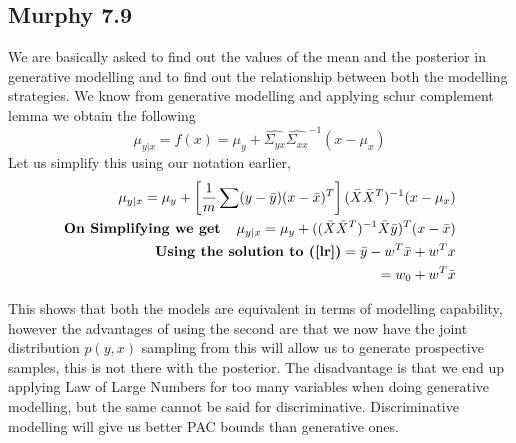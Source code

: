 \subsection{Murphy 7.9}
We are basically asked to find out the values of the mean and the posterior in generative modelling 
and to find out the relationship between both the modelling strategies.
We know from generative modelling and applying schur complement lemma we obtain the following
$$
\mu_{y|x} = f(x) = \mu_y + \hat{\Sigma_{yx}}\hat{\Sigma_{xx}}^{-1}(x - \mu_x)
$$
Let us simplify this using our notation earlier,
\begin{align}
    \mu_{y|x} = \mu_y + \left[\frac{1}{m} \sum( y - \bar{y} )( x - \bar{x})^T \right](\bar{X}\bar{X}^T)^{-1} (x - \mu_x) 
    \\
    \textbf{On Simplifying we get \ \ }
    \mu_{y|x} = \mu_y + ((\bar{X}\bar{X}^T)^{-1} \bar{X}\bar{y})^T (x - \bar{x})
    \\
    \textbf{Using the solution to (\ref{lr})} = \bar{y}  - w^T\bar{x} + w^Tx 
     \\
     = w_0 + w^T\bar{x}
\end{align}

This shows that both the models are equivalent in terms of modelling capability, 
however the advantages of using the second are that we now have the joint distribution $p(y, x)
$ sampling from this will allow us to generate prospective samples, this is not there with the posterior.
The disadvantage is that we end up applying Law of Large Numbers for too many variables when doing generative modelling,
but the same cannot be said for discriminative. Discriminative modelling will give us better PAC bounds than generative ones.
\section{}
